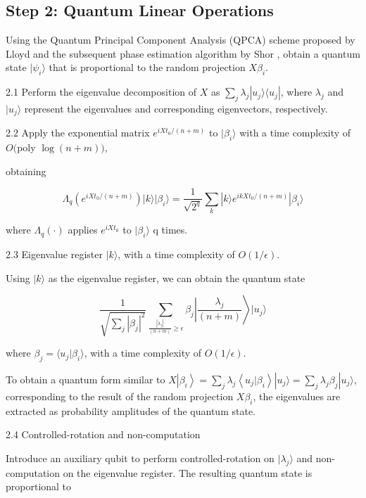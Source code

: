 \documentclass[12pt]{article}
\begin{document}
\subsection{Step 2: Quantum Linear Operations}

Using the Quantum Principal Component Analysis (QPCA) scheme proposed by Lloyd \cite{lloyd2014quantum} and the subsequent phase estimation algorithm by Shor \cite{shor1999polynomial}, obtain a quantum state $|\psi_{i}\rangle$ that is proportional to the random projection $X\beta_{i}$.

2.1 Perform the eigenvalue decomposition of $X$ as $\sum_{j} \lambda_{j}|u_{j}\rangle\langle u_{j}|$, where $\lambda_{j}$ and $|u_{j}\rangle$ represent the eigenvalues and corresponding eigenvectors, respectively.

2.2 Apply the exponential matrix $e^{i X t_{0} /(n+m)}$ to $|\beta_{i}\rangle$ with a time complexity of $O($poly $\log (n+m))$,

obtaining

$$
\Lambda_{q}\left(e^{i X t_{0} /(n+m)}\right)|k\rangle|\beta_{i}\rangle=\frac{1}{\sqrt{2^{q}}} \sum_{k}|k\rangle e^{i k X t_{0} /(n+m)}|\beta_{i}\rangle
$$

where $\Lambda_{q}(\cdot)$ applies $e^{i X t_{0}}$ to $|\beta_{i}\rangle$ q times.

2.3 Eigenvalue register $|k\rangle$, with a time complexity of $O(1 / \epsilon)$.

Using $|k\rangle$ as the eigenvalue register, we can obtain the quantum state

$$
\frac{1}{\sqrt{\sum_{j}|\beta_{j}|^{2}}} \sum_{\frac{|\lambda_{j}|}{(n+m)} \geq \epsilon} \beta_{j}\left|\frac{\lambda_{j}}{(n+m)}\right\rangle|u_{j}\rangle
$$

where $\beta_{j}=\langle u_{j}|\beta_{i}\rangle$, with a time complexity of $O(1 / \epsilon)$.

To obtain a quantum form similar to $X\left|\beta_{i}\right\rangle=\sum_{j} \lambda_{j}\left\langle u_{j}|\beta_{i}\right\rangle|u_{j}\rangle=\sum_{j} \lambda_{j}\beta_j|u_{j}\rangle$, corresponding to the result of the random projection $X\beta_{i}$, the eigenvalues are extracted as probability amplitudes of the quantum state.

2.4 Controlled-rotation and non-computation

Introduce an auxiliary qubit to perform controlled-rotation on $|\lambda_{j}\rangle$ and non-computation on the eigenvalue register. The resulting quantum state is proportional to
\end{document}
